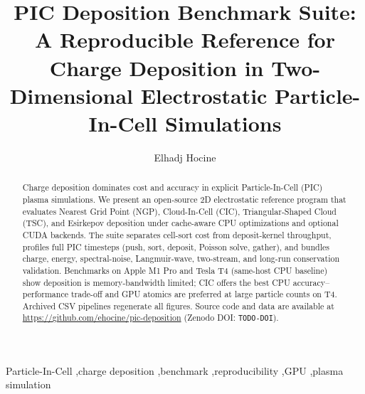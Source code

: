 \documentclass[preprint,12pt]{elsarticle}
\begin{document}
\begin{frontmatter}

\title{PIC Deposition Benchmark Suite: A Reproducible Reference for Charge Deposition in Two-Dimensional Electrostatic Particle-In-Cell Simulations}

\author[inst]{Elhadj Hocine}
\address[inst]{Independent Researcher}

\begin{abstract}
Charge deposition dominates cost and accuracy in explicit Particle-In-Cell (PIC) plasma simulations.
We present an open-source 2D electrostatic reference program that evaluates Nearest Grid Point (NGP), Cloud-In-Cell (CIC), Triangular-Shaped Cloud (TSC), and Esirkepov deposition under cache-aware CPU optimizations and optional CUDA backends.
The suite separates cell-sort cost from deposit-kernel throughput, profiles full PIC timesteps (push, sort, deposit, Poisson solve, gather), and bundles charge, energy, spectral-noise, Langmuir-wave, two-stream, and long-run conservation validation.
Benchmarks on Apple M1 Pro and Tesla T4 (same-host CPU baseline) show deposition is memory-bandwidth limited; CIC offers the best CPU accuracy--performance trade-off and GPU atomics are preferred at large particle counts on T4.
Archived CSV pipelines regenerate all figures.
Source code and data are available at \url{https://github.com/ehocine/pic-deposition} (Zenodo DOI: \texttt{TODO-DOI}).
\end{abstract}

\begin{keyword}
Particle-In-Cell \sep charge deposition \sep benchmark \sep reproducibility \sep GPU \sep plasma simulation
\end{keyword}

\end{frontmatter}

















\appendix





\end{document}
